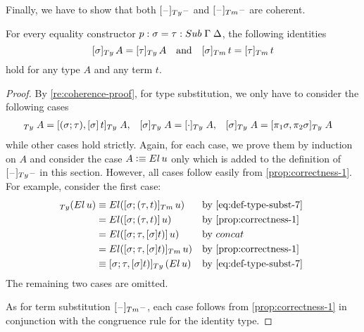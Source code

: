 \documentclass[a4paper,UKenglish,numberwithinsect,cleveref,thm-restate]{lipics-v2021}
\newcommand{\danger}{\marginpar[\hfill\dbend]{\dbend\hfill}}
\begin{document}
Finally, we have to show that both $[\blank]_{\Ty}\blank$ and $[\blank]_{\Tm}\blank$ are coherent.
\begin{proposition}[Coherence] \label{prop:coherence-2}
  For every equality constructor $p : \sigma = \tau : \Sub\;\Gamma\;\Delta$, the following identities
  \danger
  \[
    [\sigma]_{\Ty}\,A = [\tau]_{\Ty}\,A
    \quad\text{and}\quad
    [\sigma]_{\Tm}\,t = [\tau]_{\Tm}\,t
  \]
  hold for any type $A$ and any term $t$.
\end{proposition}
\begin{proof}
  By \cref{re:coherence-proof}, for type substitution, we only have to consider the following cases 
  \begin{align*}
    [\sigma; (\tau, t)]_{\Ty} \;A    & = [(\sigma;\tau), [\sigma]\, t]_{\Ty}\;A,
                                     & [\sigma]_{\Ty} \;A               & = [\emptyctx]_{\Ty}\;A,
                                     & [\sigma]_{\Ty} \;A               & = [\pi_1\sigma, \pi_2\sigma]_{\Ty}\;A
  \end{align*}
  while other cases hold strictly.
  Again, for each case, we prove them by induction on $A$ and consider the case $A \defeq \El\,u$ only which is added to the definition of $[\blank]_{\Ty}\blank$ in this section. 
  However, all cases follow easily from \cref{prop:correctness-1}.
  For example, consider the first case:
  \begin{align*}
    [\sigma; (\tau, t)]_{\Ty}(\El\,u) & \judgeq \El([\sigma; (\tau, t)]_{\Tm}\,u) && \text{by \eqref{eq:def-type-subst-7}} \\
                                      & = \El( [\sigma; (\tau, t)]\,u)            && \text{by \cref{prop:correctness-1}} \\
                                      & = \El( [\sigma; \tau, [\sigma]t)]\,u)     && \text{by $\mathsf{concat}$} \\
                                      & = \El( [\sigma; \tau, [\sigma]t)]_{\Tm}\,u) && \text{by \cref{prop:correctness-1}} \\
                                      & \judgeq [\sigma; \tau, [\sigma]t)]_{\Ty}\left(\El\,u\right) && \text{by \eqref{eq:def-type-subst-7} }
  \end{align*}
  The remaining two cases are omitted.

  As for term substitution $[\blank]_{\Tm}\blank$, each case follows from \cref{prop:correctness-1} in conjunction with the congruence rule for the identity type.
\end{proof}
\end{document}
